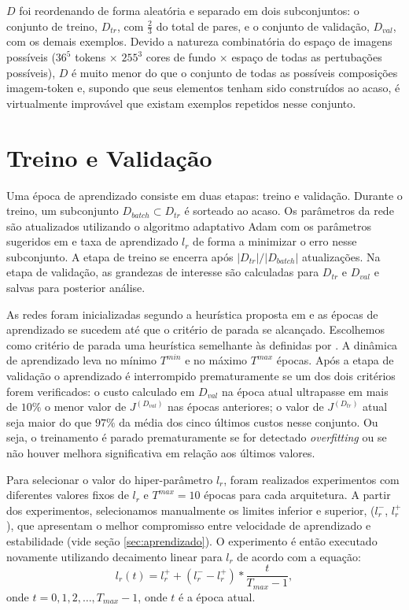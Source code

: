 $D$ foi reordenando de forma aleatória e separado em dois subconjuntos: o conjunto de treino, $D_{tr}$, com $\frac{2}{3}$ do total de pares, e o conjunto de validação, $D_{val}$, com os demais exemplos. Devido a natureza combinatória do espaço de imagens possíveis ($36^5$ tokens $\times$ $255^3$ cores de fundo $\times$ espaço de todas as pertubações possíveis), $D$ é muito menor do que o conjunto de todas as possíveis composições imagem-token e, supondo que seus elementos tenham sido construídos ao acaso, é virtualmente improvável que existam exemplos repetidos nesse conjunto. 



\section{Treino e Validação}

Uma época de aprendizado consiste em duas etapas: treino e validação. Durante o treino, um subconjunto $D_{batch} \subset D_{tr}$ é sorteado ao acaso. Os parâmetros da rede são atualizados utilizando o algoritmo adaptativo Adam com os parâmetros sugeridos em\cite{adam_op} e taxa de aprendizado $l_r$ de forma a minimizar o erro nesse subconjunto. A etapa de treino se encerra após $|D_{tr}|/|D_{batch}|$ atualizações. Na etapa de validação, as grandezas de interesse são calculadas para $D_{tr}$ e $D_{val}$ e salvas para posterior análise.

As redes foram inicializadas segundo a heurística proposta em \cite{HeZR015relu} e as épocas de aprendizado se sucedem até que o critério de parada se alcançado. Escolhemos como critério de parada uma heurística semelhante às definidas por \cite{lutz_early_stop}. A dinâmica de aprendizado leva no mínimo $T^{min}$ e no máximo $T^{max}$ épocas. Após a etapa de validação o aprendizado é interrompido prematuramente se um dos dois critérios forem verificados: o custo calculado em $D_{val}$ na época atual ultrapasse em mais de $10\%$ o menor valor de $J^{(D_{val})}$ nas épocas anteriores; o valor de $J^{(D_{tr})}$ atual seja maior do que $97\%$ da média dos cinco últimos custos nesse conjunto. Ou seja, o treinamento é parado prematuramente se for detectado \textit{overfitting} ou se não houver melhora significativa em relação aos últimos valores.

Para selecionar o valor do hiper-parâmetro $l_r$, foram realizados experimentos com diferentes valores fixos de $l_r$ e $T^{max}=10$ épocas para cada arquitetura. A partir dos experimentos, selecionamos manualmente os limites inferior e superior, ($l_r^-$, $l_r^+$), que apresentam o melhor compromisso entre velocidade de aprendizado e estabilidade (vide seção \ref{sec:aprendizado}). O experimento é então executado novamente utilizando decaimento linear para $l_r$ de acordo com a equação:
\begin{equation}
l_r(t) = l_r^+ + (l_r^- - l_r^+) * \frac{t}{T_{max}-1},
\end{equation}
onde $t = 0, 1, 2, \ldots, T_{max}-1$, onde $t$ é a época atual.


